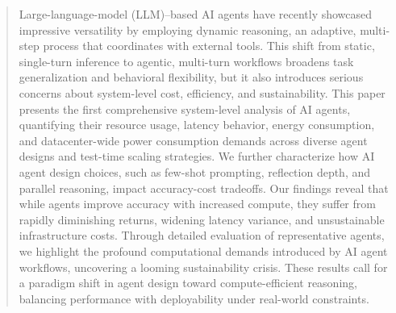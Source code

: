 
\begin{abstract}
Large-language-model (LLM)–based AI agents have recently showcased impressive versatility by employing dynamic reasoning, an adaptive, multi-step process that coordinates with external tools. This shift from static, single-turn inference to agentic, multi-turn workflows broadens task generalization and behavioral flexibility, but it also introduces serious concerns about system-level cost, efficiency, and sustainability. This paper presents the first comprehensive system-level analysis of AI agents, quantifying their resource usage, latency behavior, energy consumption, and datacenter-wide power consumption demands across diverse agent designs and test-time scaling strategies. We further characterize how AI agent design choices, such as few-shot prompting, reflection depth, and parallel reasoning, impact accuracy-cost tradeoffs. Our findings reveal that while agents improve accuracy with increased compute, they suffer from rapidly diminishing returns, widening latency variance, and unsustainable infrastructure costs. Through detailed evaluation of representative agents, we highlight the profound computational demands introduced by AI agent workflows, uncovering a looming sustainability crisis. These results call for a paradigm shift in agent design toward compute-efficient reasoning, balancing performance with deployability under real-world constraints.
\end{abstract}

